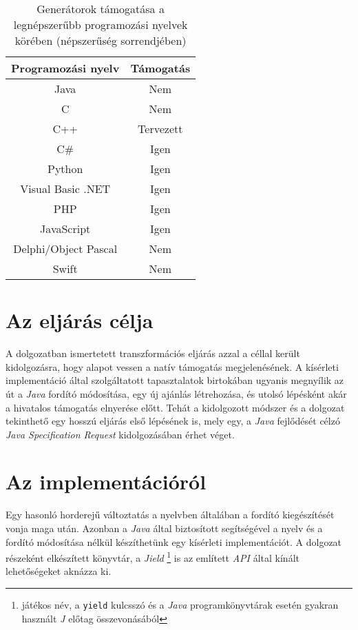 \begin{table}
\captionsetup{justification=centering}
\centering
  \begin{tabular}{|| c | c ||}
  \hline
  Programozási nyelv & Támogatás \\
  \hline \hline
  Java                  & \cellcolor{red!20}Nem \\
  C                     & \cellcolor{red!20}Nem \\
  C++                   & \cellcolor{yellow!20}Tervezett \\
  C\#                   & \cellcolor{green!20}Igen \\
  Python                & \cellcolor{green!20}Igen \\
  Visual Basic .NET     & \cellcolor{green!20}Igen \\
  PHP                   & \cellcolor{green!20}Igen \\
  JavaScript            & \cellcolor{green!20}Igen \\
  Delphi/Object Pascal  & \cellcolor{red!20}Nem \\
  Swift                 & \cellcolor{red!20}Nem \\
  \hline
  \end{tabular}
\caption{Generátorok támogatása a legnépszerűbb programozási nyelvek körében (népszerűség sorrendjében)}  
\label{table:1}
\end{table}

\section{Az eljárás célja}

A dolgozatban ismertetett transzformációs eljárás azzal a céllal került kidolgozásra, hogy alapot vessen a natív támogatás megjelenésének. A kísérleti implementáció által szolgáltatott tapasztalatok birtokában ugyanis megnyílik az út a \textit{Java} fordító módosítása, egy új ajánlás létrehozása, és utolsó lépésként akár a hivatalos támogatás elnyerése előtt. 
Tehát a kidolgozott módszer és a dolgozat tekinthető egy hosszú eljárás első lépésének is, mely egy, a \textit{Java} fejlődését célzó \textit{Java Specification Request} kidolgozásában érhet véget. 

\section{Az implementációról}

Egy hasonló horderejű változtatás a nyelvben általában a fordító kiegészítését vonja maga után. Azonban a \textit{Java} által biztosított  segítségével a nyelv és a fordító módosítása nélkül készíthetünk egy kísérleti implementációt. A dolgozat részeként elkészített könyvtár, a \textit{Jield} \footnote{játékos név, a \texttt{yield} kulcsszó és a \textit{Java} programkönyvtárak esetén gyakran használt \textit{J} előtag összevonásából} is az említett \textit{API} által kínált lehetőségeket aknázza ki.

